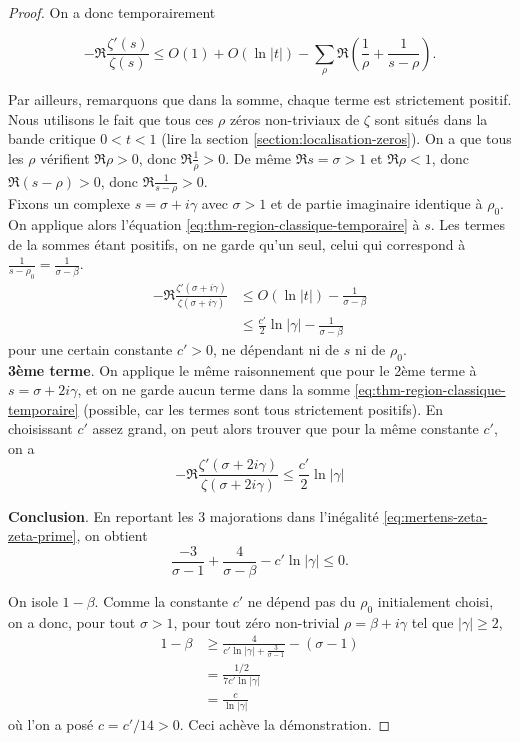 \documentclass[french]{report}
\begin{document}
\begin{proof}
  On a donc temporairement

  \begin{equation}\label{eq:thm-region-classique-temporaire}
    - \Re\frac{\zeta'(s)}{\zeta(s)}
    \leq O(1)
    + O(\ln|t|)
    - \sum_{\rho}\Re\left(\frac{1}{\rho} + \frac{1}{s-\rho} \right).
  \end{equation}

  Par ailleurs, remarquons que dans la somme, chaque terme est strictement positif. Nous utilisons le fait que tous ces $\rho$ zéros non-triviaux de $\zeta$ sont situés dans la bande critique $0<t<1$ (lire la section \ref{section:localisation-zeros}). On a que tous les $\rho$ vérifient $\Re\rho>0$, donc $\Re\frac{1}{\rho}>0$. De même $\Re s=\sigma>1$ et $\Re\rho<1$, donc $\Re(s-\rho)>0$, donc $\Re\frac{1}{s-\rho}>0$. 
  \\

  Fixons un complexe $s=\sigma+i\gamma$ avec $\sigma>1$ et de partie imaginaire identique à $\rho_0$. On applique alors l'équation \ref{eq:thm-region-classique-temporaire} à $s$. Les termes de la sommes étant positifs, on ne garde qu'un seul, celui qui correspond à $\frac{1}{s-\rho_0}=\frac{1}{\sigma-\beta}$.
  \begin{align*}
    - \Re\frac{\zeta'(\sigma+i\gamma)}{\zeta(\sigma+i\gamma)}
    &\leq O(\ln|t|)
    -\frac{1}{\sigma-\beta} \\
    &\leq\frac{c'}{2}\ln|\gamma|
    -\frac{1}{\sigma-\beta}
  \end{align*}
  pour une certain constante $c'>0$, ne dépendant ni de $s$ ni de $\rho_0$.
  \\

  \textbf{3ème terme}. On applique le même raisonnement que pour le 2ème terme à $s=\sigma+2i\gamma$, et on ne garde aucun terme dans la somme \ref{eq:thm-region-classique-temporaire} (possible, car les termes sont tous strictement positifs).
  En choisissant $c'$ assez grand, on peut alors trouver que pour la même constante $c'$, on a
  \[
    - \Re\frac{\zeta'(\sigma+2i\gamma)}{\zeta(\sigma+2i\gamma)}
    \leq\frac{c'}{2}\ln|\gamma|
  \]

  \textbf{Conclusion}. En reportant les 3 majorations dans l'inégalité \ref{eq:mertens-zeta-zeta-prime}, on obtient
  \[
    \frac{-3}{\sigma-1}+\frac{4}{\sigma-\beta}-c'\ln|\gamma|\leq0.
  \]

  On isole $1-\beta$. Comme la constante $c'$ ne dépend pas du $\rho_0$ initialement choisi, on a donc, pour tout $\sigma>1$, pour tout zéro non-trivial $\rho=\beta+i\gamma$ tel que $|\gamma|\geq2$,
  \begin{align*}
    1-\beta
    &\geq \frac{4}{c'\ln|\gamma|+\frac{3}{\sigma-1}} - (\sigma -1) \\
    &=\frac{1/2}{7c'\ln|\gamma|} \\
    &=\frac{c}{\ln|\gamma|}
  \end{align*}
  où l'on a posé $c=c'/14>0$. Ceci achève la démonstration.
\end{proof}
\end{document}
